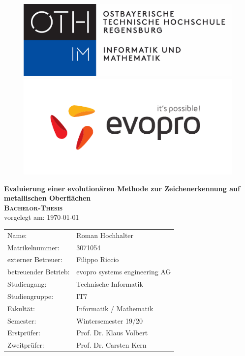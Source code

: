 
\begin{titlepage}
		\begin{figure}[!htb]
			\begin{minipage}{0.48\textwidth}
				
				\includegraphics[width=0.6\linewidth]{oth-regensburg-logo}
			\end{minipage}
			\hfill
			\begin{minipage}{0.48\textwidth}
				\flushright
				\includegraphics[width=0.5\linewidth]{evopro_logo_cmyk}
			\end{minipage}
		\end{figure}
		
		\vspace*{0.5cm}
		
		\begin{center}
			\huge \textbf{\textsf{Evaluierung einer evolutionären Methode zur Zeichenerkennung auf metallischen Oberflächen}} \\
			\vspace{5cm}
			\huge\textbf{\textsc{Bachelor-Thesis}} \\
			\vspace{1cm}
			\normalsize{vorgelegt am: \today} \\
			\vspace{2.5cm}
			\vspace{3cm}
			\normalsize{
				\begin{tabular}{ll}
					Name: & {Roman Hochhalter} \\
					Matrikelnummer: & {3071054} \\
					externer Betreuer: & Filippo Riccio \\
					betreuender Betrieb: & evopro systems engineering AG \\
					Studiengang: & Technische Informatik \\
					Studiengruppe: & IT7 \\
					Fakultät: & Informatik / Mathematik \\
					Semester: & Wintersemester 19/20 \\
					Erstprüfer: & {Prof. Dr. Klaus Volbert} \\
					Zweitprüfer: & {Prof. Dr. Carsten Kern} \\
				\end{tabular}
			}
		\end{center}
	\end{titlepage}

\cleardoublepage